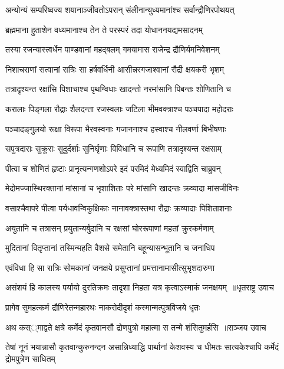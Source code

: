 \twolineshloka
{अन्योन्यं सम्परिष्वज्य शयानाञ्जीवतोऽपरान्}
{संलीनान्युध्यमानांश्च सर्वान्द्रौणिरपोथयत्}


\twolineshloka
{ब्रह्ममाना हुताशेन वध्यमानाश्च तेन ते}
{परस्परं तदा योधाननयद्यमसादनम्}


\twolineshloka
{तस्या रजन्यास्त्वर्धेन पाण्डवानां महद्बलम्}
{गमयामास राजेन्द्र द्रौणिर्यमनिवेशनम्}


\twolineshloka
{निशाचराणां सत्वानां रात्रिः सा हर्षवर्धिनी}
{आसीन्नरगजाश्वानां रौद्री क्षयकरी भृशम्}


\twolineshloka
{तत्रादृश्यन्त रक्षांसि पिशाचाश्च पृथग्विधाः}
{खादन्तो नरमांसानि पिबन्तः शोणितानि च}


\twolineshloka
{करालाः पिङ्गला रौद्राः शैलदन्ता रजस्वलाः}
{जटिला भीमवक्त्राश्च पञ्चपादा महोदराः}


\twolineshloka
{पञ्चादङ्गुलयो रूक्षा विरूपा भैरवस्वनाः}
{गजाननाश्च हस्वाश्च नीलवर्णा बिभीषणाः}


\twolineshloka
{सपुत्रदाराः सुक्रूराः सुदुर्दर्शाः सुनिर्घृणाः}
{विविधानि च रूपाणि तत्रादृश्यन्त रक्षसाम्}


\twolineshloka
{पीत्वा च शोणितं हृष्टाः प्रानृत्यन्गणशोऽपरे}
{इदं परमिदं मेध्यमिदं स्वाद्विति चाब्रुवन्}


\twolineshloka
{मेदोमज्जास्थिरक्तानां मांसानां च भृशाशिताः}
{परे मांसानि खादन्तः क्रव्यादा मांसजीविनः}


\twolineshloka
{वसाश्चैवापरे पीत्वा पर्यधावन्विकुक्षिकाः}
{नानावक्त्रास्तथा रौद्राः क्रव्यादाः पिशिताशनाः}


\twolineshloka
{अयुतानि च तत्रासन् प्रयुतान्यर्बुदानि च}
{रक्षसां घोररूपाणां महतां क्रुरकर्मणाम्}


\threelineshloka
{मुदितानां वितृप्तानां तस्मिन्महति वैशसे}
{समेतानि बहून्यासन्भूतानि च जनाधिप}
{}


\twolineshloka
{एवंविधा हि सा रात्रिः सोमकानां जनक्षये}
{प्रसुप्तानां प्रमत्तानामासीत्सुभृशदारुणा}


\threelineshloka
{असंशयं हि कालस्य पर्यायो दुरतिक्रमः}
{तादृशा निहता यत्र कृत्वाऽस्माकं जनक्षयम् ॥धृतराष्ट्र उवाच}
{}


\twolineshloka
{प्रागेव सुमहत्कर्म द्रौणिरेतन्महारथः}
{नाकरोदीदृशं कस्मान्मत्पुत्रविजये धृतः}


\threelineshloka
{अथ कस््माद्वते क्षत्रे कर्मेदं कृतवानसौ}
{द्रोणपुत्रो महात्मा स तन्मे शंसितुमर्हसि ॥सञ्जय उवाच}
{}


\threelineshloka
{तेषां नूनं भयान्नासौ कृतवान्कुरुनन्दन}
{असान्निध्याद्धि पार्थानां केशवस्य च धीमतः}
{सात्यकेश्चापि कर्मेदं द्रोमपुत्रेण साधितम्}


